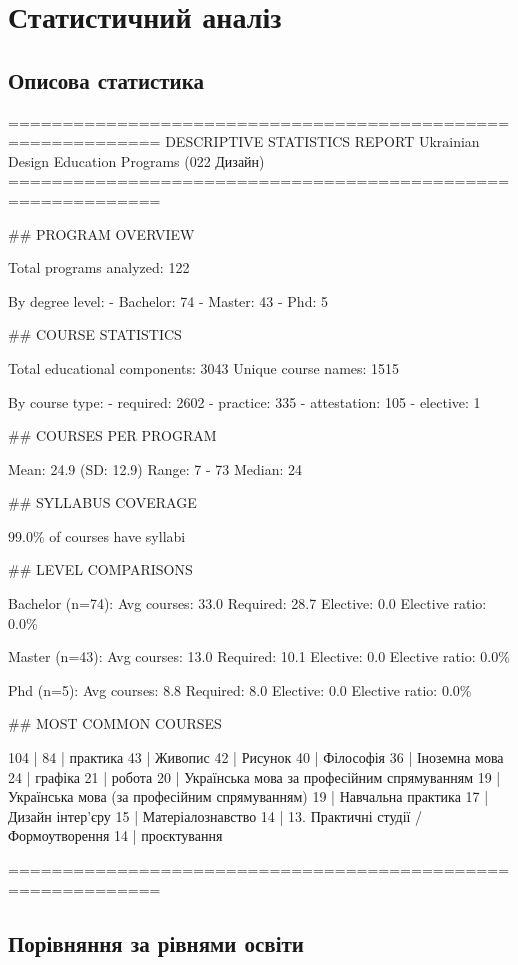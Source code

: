 \chapter{Статистичний аналіз}

\section{Описова статистика}

============================================================
DESCRIPTIVE STATISTICS REPORT
Ukrainian Design Education Programs (022 Дизайн)
============================================================

\#\# PROGRAM OVERVIEW

Total programs analyzed: 122

By degree level:
  - Bachelor: 74
  - Master: 43
  - Phd: 5

\#\# COURSE STATISTICS

Total educational components: 3043
Unique course names: 1515

By course type:
  - required: 2602
  - practice: 335
  - attestation: 105
  - elective: 1

\#\# COURSES PER PROGRAM

Mean: 24.9 (SD: 12.9)
Range: 7 - 73
Median: 24

\#\# SYLLABUS COVERAGE

99.0\% of courses have syllabi

\#\# LEVEL COMPARISONS


Bachelor (n=74):
  Avg courses: 33.0
  Required: 28.7
  Elective: 0.0
  Elective ratio: 0.0\%

Master (n=43):
  Avg courses: 13.0
  Required: 10.1
  Elective: 0.0
  Elective ratio: 0.0\%

Phd (n=5):
  Avg courses: 8.8
  Required: 8.0
  Elective: 0.0
  Elective ratio: 0.0\%

\#\# MOST COMMON COURSES

  104 | 
   84 | практика
   43 | Живопис
   42 | Рисунок
   40 | Філософія
   36 | Іноземна мова
   24 | графіка
   21 | робота
   20 | Українська мова за професійним спрямуванням
   19 | Українська мова (за професійним спрямуванням)
   19 | Навчальна практика
   17 | Дизайн інтер’єру
   15 | Матеріалознавство
   14 | 13. Практичні студії / Формоутворення
   14 | проєктування

============================================================

\section{Порівняння за рівнями освіти}

